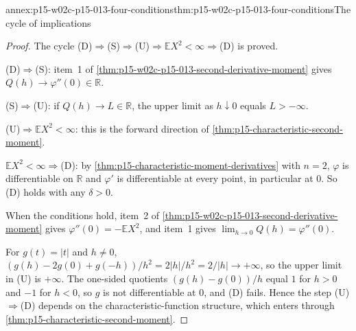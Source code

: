 \begin{annexitem}{annex:p15-w02c-p15-013-four-conditions}{thm:p15-w02c-p15-013-four-conditions}{The cycle of implications}
\begin{proof}
The cycle (D)\(\Rightarrow\)(S)\(\Rightarrow\)(U)\(\Rightarrow\)\(\mathbb EX^2<\infty\)\(\Rightarrow\)(D)
is proved.

(D)\(\Rightarrow\)(S): item~1 of
\cref{thm:p15-w02c-p15-013-second-derivative-moment} gives
\(Q(h)\to\varphi''(0)\in\mathbb R\).

(S)\(\Rightarrow\)(U): if \(Q(h)\to L\in\mathbb R\), the upper limit as
\(h\downarrow0\) equals \(L>-\infty\).

(U)\(\Rightarrow\mathbb EX^2<\infty\): this is the forward direction of
\cref{thm:p15-characteristic-second-moment}.

\(\mathbb EX^2<\infty\Rightarrow\)(D): by
\cref{thm:p15-characteristic-moment-derivatives} with \(n=2\), \(\varphi\) is
differentiable on \(\mathbb R\) and \(\varphi'\) is differentiable at every
point, in particular at \(0\). So (D) holds with any \(\delta>0\).

When the conditions hold, item~2 of
\cref{thm:p15-w02c-p15-013-second-derivative-moment} gives
\(\varphi''(0)=-\mathbb EX^2\), and item~1 gives
\(\lim_{h\to0}Q(h)=\varphi''(0)\).

For \(g(t)=|t|\) and \(h\neq0\),
\((g(h)-2g(0)+g(-h))/h^2=2|h|/h^2=2/|h|\to+\infty\), so the upper limit in
(U) is \(+\infty\). The one-sided quotients \((g(h)-g(0))/h\) equal \(1\) for
\(h>0\) and \(-1\) for \(h<0\), so \(g\) is not differentiable at \(0\), and
(D) fails. Hence the step (U)\(\Rightarrow\)(D) depends on the
characteristic-function structure, which enters through
\cref{thm:p15-characteristic-second-moment}.
\end{proof}
\end{annexitem}

